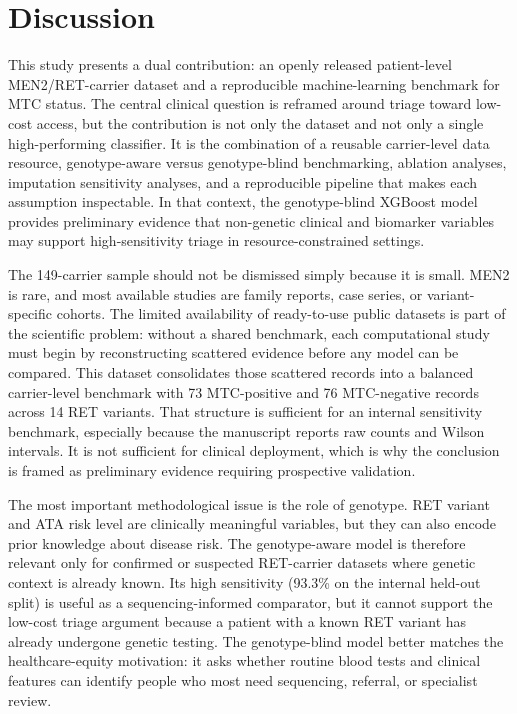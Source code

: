 \documentclass[12pt]{article}
\begin{document}
\section{Discussion}
This study presents a dual contribution: an openly released patient-level MEN2/RET-carrier dataset and a reproducible machine-learning benchmark for MTC status. The central clinical question is reframed around triage toward low-cost access, but the contribution is not only the dataset and not only a single high-performing classifier. It is the combination of a reusable carrier-level data resource, genotype-aware versus genotype-blind benchmarking, ablation analyses, imputation sensitivity analyses, and a reproducible pipeline that makes each assumption inspectable. In that context, the genotype-blind XGBoost model provides preliminary evidence that non-genetic clinical and biomarker variables may support high-sensitivity triage in resource-constrained settings.

The 149-carrier sample should not be dismissed simply because it is small. MEN2 is rare, and most available studies are family reports, case series, or variant-specific cohorts. The limited availability of ready-to-use public datasets is part of the scientific problem: without a shared benchmark, each computational study must begin by reconstructing scattered evidence before any model can be compared. This dataset consolidates those scattered records into a balanced carrier-level benchmark with 73 MTC-positive and 76 MTC-negative records across 14 RET variants. That structure is sufficient for an internal sensitivity benchmark, especially because the manuscript reports raw counts and Wilson intervals. It is not sufficient for clinical deployment, which is why the conclusion is framed as preliminary evidence requiring prospective validation.

The most important methodological issue is the role of genotype. RET variant and ATA risk level are clinically meaningful variables, but they can also encode prior knowledge about disease risk. The genotype-aware model is therefore relevant only for confirmed or suspected RET-carrier datasets where genetic context is already known. Its high sensitivity (93.3\% on the internal held-out split) is useful as a sequencing-informed comparator, but it cannot support the low-cost triage argument because a patient with a known RET variant has already undergone genetic testing. The genotype-blind model better matches the healthcare-equity motivation: it asks whether routine blood tests and clinical features can identify people who most need sequencing, referral, or specialist review.
\end{document}
